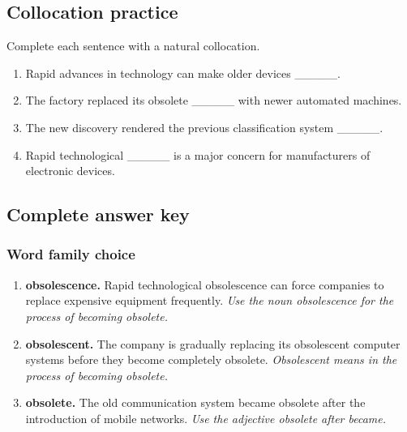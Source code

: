 \documentclass[11pt]{article}
\begin{document}
\subsection{Collocation practice}
Complete each sentence with a natural collocation.

\begin{enumerate}
  \item Rapid advances in technology can make older devices \_\_\_\_\_.
  \item The factory replaced its obsolete \_\_\_\_\_ with newer automated machines.
  \item The new discovery rendered the previous classification system \_\_\_\_\_.
  \item Rapid technological \_\_\_\_\_ is a major concern for manufacturers of electronic devices.
\end{enumerate}

\subsection{Complete answer key}
\subsubsection{Word family choice}
\begin{enumerate}
  \item \textbf{obsolescence.} Rapid technological obsolescence can force companies to replace expensive equipment frequently. \emph{Use the noun obsolescence for the process of becoming obsolete.}
  \item \textbf{obsolescent.} The company is gradually replacing its obsolescent computer systems before they become completely obsolete. \emph{Obsolescent means in the process of becoming obsolete.}
  \item \textbf{obsolete.} The old communication system became obsolete after the introduction of mobile networks. \emph{Use the adjective obsolete after became.}
\end{enumerate}
\end{document}
